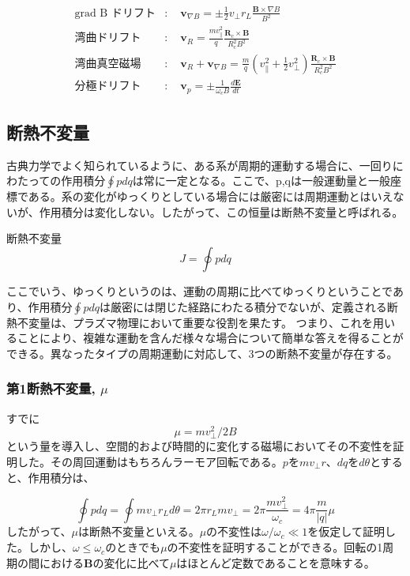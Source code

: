 \documentclass{ltjsarticle}
\numberwithin{equation}{section} %
\begin{document}
\begin{align}
\text{grad B ドリフト} &: \quad 
  \bm{v}_{\nabla B} = \pm \frac{1}{2} v_\perp r_L \frac{\bm{B} \times \nabla B}{B^2} \label{2.24}\\
\text{湾曲ドリフト} &: \quad 
  \bm{v}_R = \frac{m v_\parallel^2}{q}\frac{\bm{R}_c \times \bm{B}}{R_c^2 B^2} \label{2.26}\\
\text{湾曲真空磁場} &: \quad 
  \bm{v}_R + \bm{v}_{\nabla B} = \frac{m}{q} \left( v_\parallel^2 + \frac{1}{2}v_\perp^2 \right)\frac{\bm{R}_c \times \bm{B}}{R_c^2 B^2}\\
\text{分極ドリフト} &: \quad 
  \bm{v}_p = \pm \frac{1}{\omega_c B} \frac{d\bm{E}}{dt}
\end{align}


\subsection{断熱不変量}
古典力学でよく知られているように、ある系が周期的運動する場合に、一回りにわたっての作用積分$\oint pdq$は常に一定となる。ここで、p,qは一般運動量と一般座標である。系の変化がゆっくりとしている場合には厳密には周期運動とはいえないが、作用積分は変化しない。したがって、この恒量は断熱不変量と呼ばれる。

\begin{eqbox}{断熱不変量}
\begin{equation}
  J = \oint pdq
\end{equation}
\end{eqbox}
ここでいう、ゆっくりというのは、運動の周期に比べてゆっくりということであり、作用積分$\oint pdq$は厳密には閉じた経路にわたる積分でないが、定義される断熱不変量は、プラズマ物理において重要な役割を果たす。
つまり、これを用いることにより、複雑な運動を含んだ様々な場合について簡単な答えを得ることができる。異なったタイプの周期運動に対応して、3つの断熱不変量が存在する。

\subsubsection{第1断熱不変量, $\mu$}
すでに
\[
  \mu = mv^2_\perp / 2B
\]
という量を導入し、空間的および時間的に変化する磁場においてその不変性を証明した。その周回運動はもちろんラーモア回転である。$p$を$mv_\perp r$、$dq$を$d\theta$とすると、作用積分は、

\begin{equation}
  \oint pdq = \oint mv_\perp r_L d\theta = 2\pi r_L mv_\perp = 2\pi \frac{mv^2_\perp}{\omega_c} = 4\pi \frac{m}{|q|}\mu
\end{equation}
したがって、$\mu$は断熱不変量といえる。$\mu$の不変性は$\omega/\omega_c \ll 1$を仮定して証明した。しかし、$\omega \leq \omega_c$のときでも$\mu$の不変性を証明することができる。回転の1周期の間における$\bm{B}$の変化に比べて$\mu$はほとんど定数であることを意味する。
\end{document}
